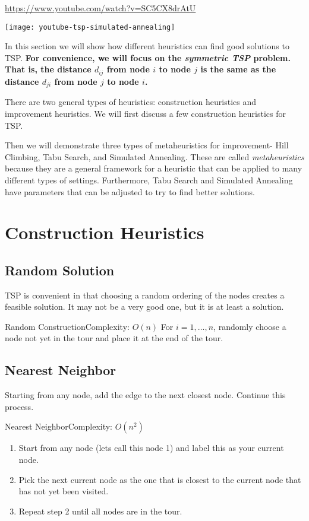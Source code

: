 
\url{https://www.youtube.com/watch?v=SC5CX8drAtU}

\texttt{[image: youtube-tsp-simulated-annealing]}

In this section we will show how different heuristics can find good solutions to TSP.  \textbf{ For convenience,  we will focus on the \emph{symmetric TSP} problem.  That is, the distance $d_{ij}$ from node $i$ to node $j$ is the same as the distance $d_{ji}$ from node $j$ to node $i$.}

There are two general types of heuristics: construction heuristics and improvement heuristics.  We will first discuss a few construction heuristics for TSP.


Then we will demonstrate three types of metaheuristics for improvement- Hill Climbing, Tabu Search, and Simulated Annealing.  These are called \emph{metaheuristics} because they are a general framework for a heuristic that can be applied to many different types of settings.  Furthermore, Tabu Search and Simulated Annealing have parameters that can be adjusted to try to find better solutions.  

\section{Construction Heuristics}
\subsection{Random Solution}
TSP is convenient in that choosing a random ordering of the nodes creates a feasible solution.  It may not be a very good one, but it is at least a solution.

\begin{general}{Random Construction}{Complexity: $O(n)$}
\label{heuristic:random}
For $i=1, \dots, n$, randomly choose a node not yet in the tour and place it at the end of the tour.
\end{general}

\subsection{Nearest Neighbor}
Starting from any node, add the edge to the next closest node.  Continue this process.
\begin{general}{Nearest Neighbor}{Complexity: $O(n^2)$}
\label{heuristic:nearestNeighbor}
\begin{enumerate}
\item Start from any node (lets call this node 1) and label this as your current node.
\item Pick the next current node as the one that is closest to the current node that has not yet been visited.
\item Repeat step 2 until all nodes are in the tour.
\end{enumerate}
\end{general}

